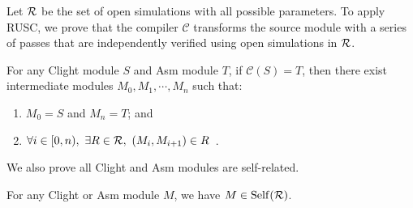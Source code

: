 Let $\mathcal{R}$ be the set of open simulations with all possible parameters.
To apply RUSC, we prove that the \ccm{} compiler $\mathcal{C}$ transforms the source module with
a series of passes that are independently verified using open simulations in $\mathcal{R}$.
\begin{lemma}\label{thm:results-passes}
  For any \textrm{Clight} module $S$ and \textrm{Asm} module $T$, if $\mathcal{C}(S) = T$, then
  there exist intermediate modules $M_0, M_1, \cdots, M_n$ such that:
  \begin{enumerate}
  \item $M_0 = S$ and $M_n = T$; and
  \item $\forall i \in [0,n),~ \exists R \in \mathcal{R},~ (M_i, M_{i+1}) \in R$~.
  \end{enumerate}
\end{lemma}

We also prove all \textrm{Clight} and \textrm{Asm} modules are self-related.
\begin{lemma}\label{thm:results-relatedness} For any \textrm{Clight} or \textrm{Asm}
  module $M$, we have $M \in \mathrm{Self}(\mathcal{R})$.
\end{lemma}
\noindent
{}

